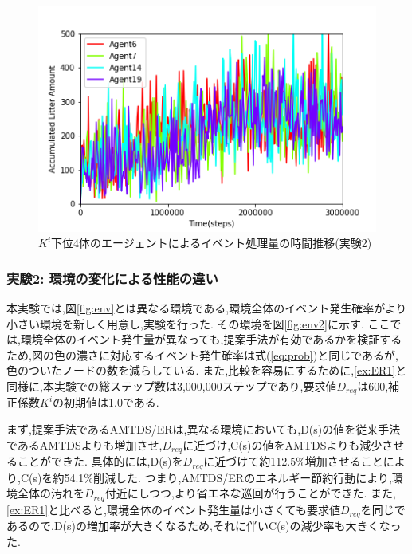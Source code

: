 \documentclass[12pt,a4j,twoside]{jarticle}
\begin{document}
  \begin{figure}
    \centering
    \includegraphics[width=150mm]{figures/al_graph_ER_Complex_worst.png}
    \caption{$K^i$下位4体のエージェントによるイベント処理量の時間推移(実験2)}
    \label{fig:al_ER_Complex_worst}
  \end{figure}

  \subsubsection{実験2: 環境の変化による性能の違い}
  \label{ex:ER2}
  本実験では,図\ref{fig:env}とは異なる環境である,環境全体のイベント発生確率がより小さい環境を新しく用意し,実験を行った.
  その環境を図\ref{fig:env2}に示す.
  ここでは,環境全体のイベント発生量が異なっても,提案手法が有効であるかを検証するため,図の色の濃さに対応するイベント発生確率は式(\ref{eq:prob})と同じであるが,色のついたノードの数を減らしている.
  また,比較を容易にするために,\ref{ex:ER1}と同様に,本実験での総ステップ数は3,000,000ステップであり,要求値$D_{req}$は600,補正係数$K^i$の初期値は1.0である.

  \par
  まず,提案手法であるAMTDS/ERは,異なる環境においても,D(s)の値を従来手法であるAMTDSよりも増加させ,$D_{req}$に近づけ,C(s)の値をAMTDSよりも減少させることができた.
  具体的には,D(s)を$D_{req}$に近づけて約112.5\%増加させることにより,C(s)を約54.1\%削減した.
  つまり,AMTDS/ERのエネルギー節約行動により,環境全体の汚れを$D_{req}$付近にしつつ,より省エネな巡回が行うことができた.
  また,\ref{ex:ER1}と比べると,環境全体のイベント発生量は小さくても要求値$D_{req}$を同じであるので,D(s)の増加率が大きくなるため,それに伴いC(s)の減少率も大きくなった.
  
\end{document}
